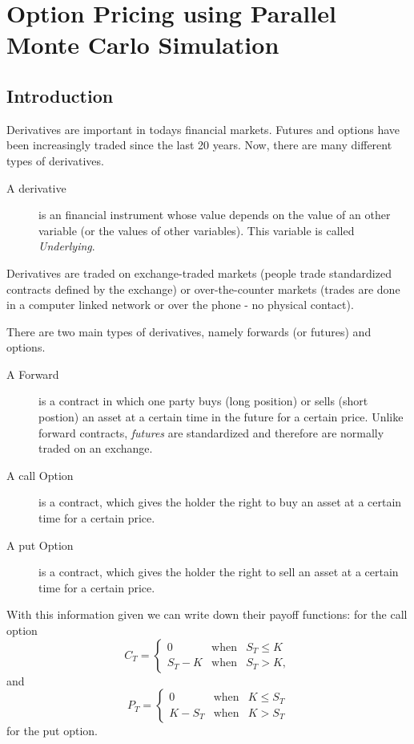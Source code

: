 \chapter{Option Pricing using Parallel Monte Carlo Simulation}
\section{Introduction}
\label{sec:optionintro}
Derivatives are important in todays financial markets. Futures and
options have been increasingly traded since the last 20 years. Now,
there are many different types of derivatives.
\begin{description}
\item[A derivative] is an financial instrument whose value depends on
  the value of an other variable (or the values of other
  variables). This variable is called \textit{Underlying}.
\end{description}
Derivatives are traded on exchange-traded markets (people trade
standardized contracts defined by the exchange) or over-the-counter
markets (trades are done in a computer linked network or over the
phone - no physical contact).

There are two main types of derivatives, namely forwards (or futures)
and options.

\begin{description}
\item[A Forward] is a contract in which one party buys (long position)
  or sells (short postion) an
  asset at a certain time in the future for a certain price. Unlike
  forward contracts, \textit{futures} are standardized and therefore
  are normally traded on an exchange.
\item[A call Option] is a contract, which gives the holder the right
  to buy an asset at a certain time for a certain price. 
\item[A put Option] is a contract, which gives the holder the right
  to sell an asset at a certain time for a certain price. 
\end{description}

With this information given we can write down their payoff functions:\newline
for the call option
\begin{equation}\label{eq:call}
C_T = \left\{ \begin{array}{lcl} 0 & \textrm{when}& S_T \leq K \\
                         S_T - K & \textrm{when} & S_T > K, \end{array}\right.
\end{equation}
and
\begin{equation}\label{eq:put}
P_T = \left\{ \begin{array}{lcl} 0 & \textrm{when}& K \leq S_T \\
                         K - S_T & \textrm{when} & K > S_T \end{array}\right.
\end{equation}
for the put option.

